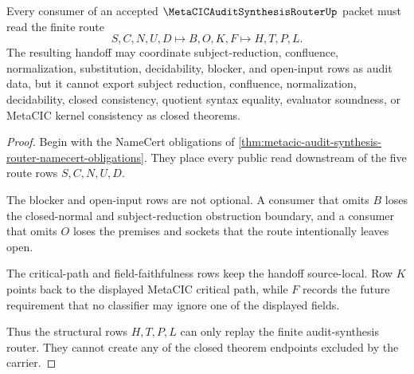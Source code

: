 \begin{theorem}
\label{thm:metacic-audit-synthesis-router-nonescape}
Every consumer of an accepted $\MetaCICAuditSynthesisRouterUp$ packet must read the finite route
$$
S,C,N,U,D \longmapsto B,O,K,F \longmapsto H,T,P,L .
$$
The resulting handoff may coordinate subject-reduction, confluence, normalization, substitution, decidability, blocker, and open-input rows as audit data, but it cannot export subject reduction, confluence, normalization, decidability, closed consistency, quotient syntax equality, evaluator soundness, or MetaCIC kernel consistency as closed theorems.
\end{theorem}
\begin{proof}
Begin with the NameCert obligations of \autoref{thm:metacic-audit-synthesis-router-namecert-obligations}. They place every public read downstream of the five route rows $S,C,N,U,D$.

The blocker and open-input rows are not optional. A consumer that omits $B$ loses the closed-normal and subject-reduction obstruction boundary, and a consumer that omits $O$ loses the premises and sockets that the route intentionally leaves open.

The critical-path and field-faithfulness rows keep the handoff source-local. Row $K$ points back to the displayed MetaCIC critical path, while $F$ records the future requirement that no classifier may ignore one of the displayed fields.

Thus the structural rows $H,T,P,L$ can only replay the finite audit-synthesis router. They cannot create any of the closed theorem endpoints excluded by the carrier.
\end{proof}




